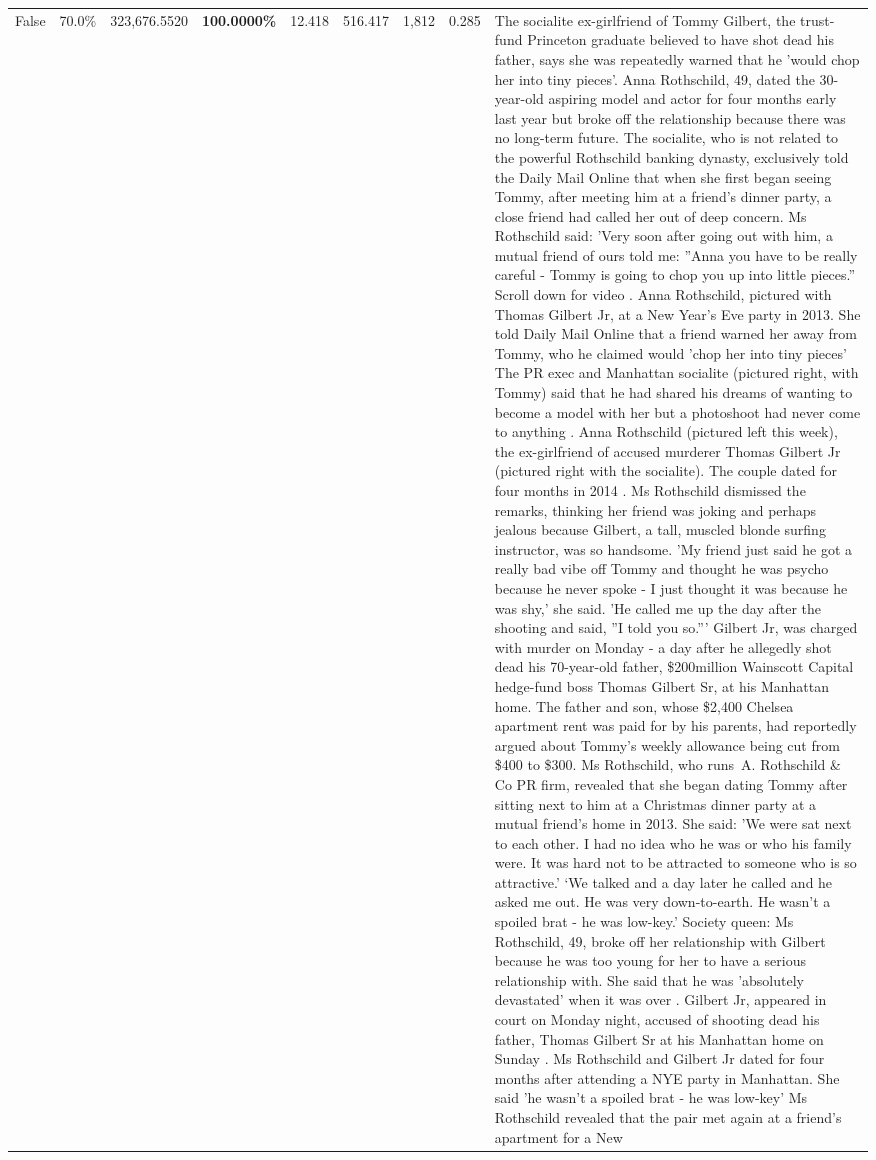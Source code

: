 \begin{table}[H]
\begin{tabular}{lllrlllll}
False & 70.0\% & 323,676.5520 & \bfseries \color{red} 100.0000\% & 12.418 & 516.417 & 1,812 & 0.285 & The socialite ex-girlfriend of Tommy Gilbert, the trust-fund Princeton graduate believed to have shot dead his father, says she was repeatedly warned that he 'would chop her into tiny pieces'. Anna Rothschild, 49, dated the 30-year-old aspiring model and actor for four months early last year but broke off the relationship because there was no long-term future. The socialite, who is not related to the powerful Rothschild banking dynasty, exclusively told the Daily Mail Online that when she first began seeing Tommy, after meeting him at a friend's dinner party, a close friend had called her out of deep concern. Ms Rothschild said: 'Very soon after going out with him, a mutual friend of ours told me: ''Anna you have to be really careful - Tommy is going to chop you up into little pieces.'' Scroll down for video . Anna Rothschild, pictured with Thomas Gilbert Jr, at a New Year's Eve party in 2013. She told Daily Mail Online that a friend warned her away from Tommy, who he claimed would 'chop her into tiny pieces' The PR exec and Manhattan socialite (pictured right, with Tommy) said that he had shared his dreams of wanting to become a model with her but a photoshoot had never come to anything . Anna Rothschild (pictured left this week), the ex-girlfriend of accused murderer Thomas Gilbert Jr (pictured right with the socialite). The couple dated for four months in 2014 . Ms Rothschild dismissed the remarks, thinking her friend was joking and perhaps jealous because Gilbert, a tall, muscled blonde surfing instructor, was so handsome. 'My friend just said he got a really bad vibe off Tommy and thought he was psycho because he never spoke - I just thought it was because he was shy,' she said. 'He called me up the day after the shooting and said, ''I told you so.''' Gilbert Jr, was charged with murder on Monday - a day after he allegedly shot dead his 70-year-old father, \$200million Wainscott Capital hedge-fund boss Thomas Gilbert Sr, at his Manhattan home. The father and son, whose \$2,400 Chelsea apartment rent was paid for by his parents, had reportedly argued about Tommy's weekly allowance being cut from \$400 to \$300. Ms Rothschild, who runs A. Rothschild \& Co PR firm, revealed that she began dating Tommy after sitting next to him at a Christmas dinner party at a mutual friend's home in 2013. She said: 'We were sat next to each other. I had no idea who he was or who his family were. It was hard not to be attracted to someone who is so attractive.' ‘We talked and a day later he called and he asked me out. He was very down-to-earth. He wasn’t a spoiled brat - he was low-key.’ Society queen: Ms Rothschild, 49, broke off her relationship with Gilbert because he was too young for her to have a serious relationship with. She said that he was 'absolutely devastated' when it was over . Gilbert Jr, appeared in court on Monday night, accused of shooting dead his father, Thomas Gilbert Sr at his Manhattan home on Sunday . Ms Rothschild and Gilbert Jr dated for four months after attending a NYE party in Manhattan. She said 'he wasn't a spoiled brat - he was low-key' Ms Rothschild revealed that the pair met again at a friend’s apartment for a New 
\end{tabular}
\end{table}
